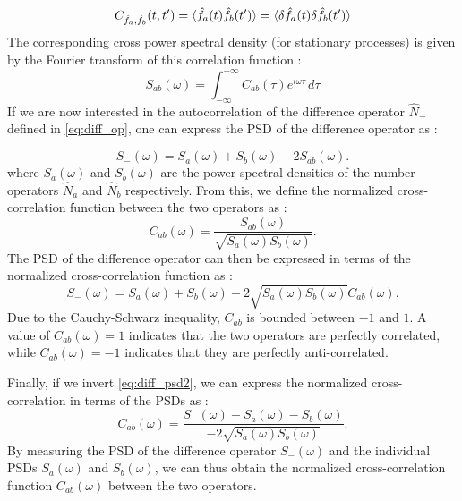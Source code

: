 \begin{equation}
    \label{eq:crosscorr}
    C_{\hat{f}_a,\hat{f}_b}(t,t') = \langle \hat{f}_a(t)\hat{f}_b(t') \rangle = \langle \delta \hat{f}_a(t) \delta \hat{f}_b(t') \rangle
\end{equation}
The corresponding cross power spectral density (for stationary processes) is given by the Fourier transform of this correlation function :
\begin{equation}
    S_{ab}(\omega) = \int_{-\infty}^{+\infty} C_{ab}(\tau) e^{i \omega \tau} \, d\tau
\end{equation}
If we are now interested in the autocorrelation of the difference operator $\hat{N}_-$ defined in \autoref{eq:diff_op}, one can express the PSD of the difference operator as  \cite{bachor_guide_1998} :

\begin{equation}
    \label{eq:diff_psd}
    S_{-}(\omega) = S_{a}(\omega) + S_{b}(\omega) - 2S_{ab}(\omega).
\end{equation}
where $S_{a}(\omega)$ and $S_{b}(\omega)$ are the power spectral densities of the number operators $\hat{N}_a$ and $\hat{N}_b$ respectively.
From this, we define the normalized cross-correlation function between the two operators as :
\begin{equation}
    \label{eq:crosscorr_norm}
    C_{ab}(\omega) = \dfrac{S_{ab}(\omega)}{\sqrt{S_a(\omega) S_b(\omega)}}.
\end{equation}
The PSD of the difference operator can then be expressed in terms of the normalized cross-correlation function as :
\begin{equation}
    \label{eq:diff_psd2}
    S_{-}(\omega) = S_{a}(\omega) + S_{b}(\omega) - 2\sqrt{S_a(\omega) S_b(\omega)}C_{ab}(\omega).
\end{equation}
Due to the Cauchy-Schwarz inequality, $C_{ab}$ is bounded between $-1$ and $1$. A value of $C_{ab}(\omega)=1$ indicates that the two operators are perfectly correlated, while $C_{ab}(\omega)=-1$ indicates that they are perfectly anti-correlated. 

\bigskip

Finally, if we invert \autoref{eq:diff_psd2}, we can express the normalized cross-correlation in terms of the PSDs as :
\begin{equation}
    \label{eq:crosscorr_norm2}
    C_{ab}(\omega) = \dfrac{S_{-}(\omega) - S_a(\omega) - S_b(\omega)}{-2\sqrt{S_a(\omega) S_b(\omega)}}.
\end{equation}
By measuring the PSD of the difference operator $S_{-}(\omega)$ and the individual PSDs $S_a(\omega)$ and $S_b(\omega)$, we can thus obtain the normalized cross-correlation function $C_{ab}(\omega)$ between the two operators.

